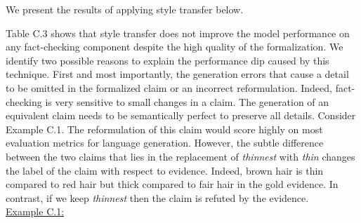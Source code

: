 We present the results of applying style transfer below.
\begin{table}[H]
\hspace{-0.2cm}
\smallskip
\caption{Impact of style transfer on each stage of the fact-checking process on DialFact \textsc{Dev}.}
\end{table}
Table C.3 shows that style transfer does not improve the model performance on any fact-checking component despite the high quality of the formalization. We identify two possible reasons to explain the performance dip caused by this technique. First and most importantly, the generation errors that cause a detail to be omitted in the formalized claim or an incorrect reformulation. Indeed, fact-checking is very sensitive to small changes in a claim. The generation of an equivalent claim needs to be semantically perfect to preserve all details. 
Consider Example C.1. The reformulation of this claim would score highly on most evaluation metrics for language generation. However, the subtle difference between the two claims that lies in the replacement of \textit{thinnest} with \textit{thin} changes the label of the claim with respect to evidence. Indeed, brown hair is thin compared to red hair but thick compared to fair hair in the gold evidence. In contrast, if we keep \textit{thinnest} then the claim is refuted by the evidence. 
\vspace{0.2cm}\\
\noindent\underline{Example C.1:}


